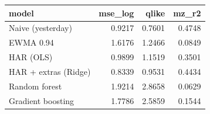 \begin{tabular}{lrrr}
\toprule
model & mse_log & qlike & mz_r2 \\
\midrule
Naive (yesterday) & 0.9217 & 0.7601 & 0.4748 \\
EWMA 0.94 & 1.6176 & 1.2466 & 0.0849 \\
HAR (OLS) & 0.9899 & 1.1519 & 0.3501 \\
HAR + extras (Ridge) & 0.8339 & 0.9531 & 0.4434 \\
Random forest & 1.9214 & 2.8658 & 0.0629 \\
Gradient boosting & 1.7786 & 2.5859 & 0.1544 \\
\bottomrule
\end{tabular}
